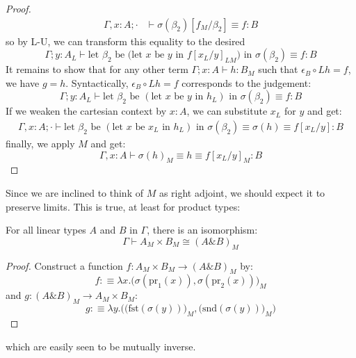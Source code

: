 \begin{thm}[$L \dashv M$]
\begin{proof}
\[\begin{split}
    \Gamma, x : A; \cdot &\vdash \sigma(\beta_2)[f_M / \beta_2] \equiv f : B
  \end{split}
\]
so by L-U, we can transform this equality to the desired
\[
\Gamma; y : A_L \vdash \text{let $\beta_2$ be (let $x$ be $y$ in $f[x_L/y]_{LM}$) in }\sigma(\beta_2) \equiv f : B
\]
  It remains to show that for any other term $\Gamma; x : A \vdash h : B_M$ such that $\epsilon_B \circ Lh = f$, we have $g = h$. Syntactically, $\epsilon_B \circ Lh = f$  corresponds to the judgement:
  \[
    \Gamma; y : A_L \vdash \text{let $\beta_2$ be $(\text{let $x$ be $y$ in $h_L$})$ in }\sigma(\beta_2) \equiv f : B
  \]
  If we weaken the cartesian context by $x : A$, we can substitute $x_L$ for $y$ and get:
  \[
    \begin{split}
      \Gamma, x : A; \cdot \vdash \text{let $\beta_2$ be $(\text{let $x$ be $x_L$ in $h_L$})$ in }\sigma(\beta_2) \equiv \sigma(h) \equiv f[x_L/y] : B
    \end{split}
    \]
    finally, we apply $M$ and get:
    \[
      \Gamma, x : A \vdash \sigma(h)_M \equiv h \equiv f[x_L/y]_M : B
    \]
\end{proof}
\end{thm}
Since we are inclined to think of $M$ as right adjoint, we should expect it to preserve limits. This is true, at least for product types:
\begin{thm}For all linear types $A$ and $B$ in $\Gamma$, there is an isomorphism:
  \[
    \Gamma \vdash A_M \times B_M \cong (A \& B)_M
  \]
  \begin{proof}
    Construct a function $f : A_M \times B_M \to (A \& B)_M$ by:
    \[
      f :\equiv \lambda x. \Big (\sigma(\text{pr}_1(x)), \sigma(\text{pr}_2(x))\Big)_M
    \]
    and $g : (A \& B)_M \to A_M \times B_M$:
    \[
      g :\equiv \lambda y. \Big (\big(\text{fst}(\sigma(y))\big )_M, \big (\text{snd}(\sigma(y))\big)_M \Big)
    \]
  \end{proof}
which are easily seen to be mutually inverse.
\end{thm}

